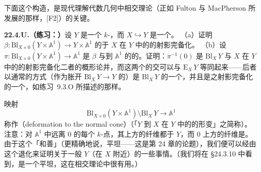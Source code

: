下面这个构造，是现代理解代数几何中相交理论（正如 Fulton 与 MacPherson 所发展的那样，[F2]）的关键。

\textbf{22.4.U.（练习：\trDeformationToTheNormalCone）}\quad 设 $Y$ 是一个 $k$-\trVariety，而 $X\hookrightarrow Y$ 是一个\trClosedSubscheme。
（a）证明 $\beta\colon\mathrm{Bl}_{X\times 0}(Y\times\mathbb{A}^1)\to Y\times\mathbb{A}^1$ 的\trExceptionalDivisor{}\trIsomorphic{}于 $X$ 在 $Y$ 中的\trNormal\trCone{}的射影完备化。
（b）设 $\pi\colon\mathrm{Bl}_{X\times 0}(Y\times\mathbb{A}^1)\to\mathbb{A}^1$ 是 $\beta$ 与到 $\mathbb{A}^1$ 的\trProjection{}的\trComposition。证明：$\pi^{-1}(0)$ 是 $\mathrm{Bl}_X\,Y$ 与 $X$ 在 $Y$ 中的\trNormal\trCone{}的射影完备化二者的概形论并，而这两个\trSubscheme{}的交可以与 $\mathrm{E}_X\,Y$ 等同起来——后者以通常的方式（作为胀开 $\mathrm{Bl}_X\,Y\to Y$ 的\trExceptionalDivisor）是 $\mathrm{Bl}_X\,Y$ 的一个\trClosedSubscheme，并且是\trNormal\trCone{}之射影完备化的一个\trClosedSubscheme，如\mbox{练习~9.3.O} 所描述的那样。

映射
\[
\mathrm{Bl}_{X\times 0}(Y\times\mathbb{A}^1)\setminus\mathrm{Bl}_X\,Y\longrightarrow\mathbb{A}^1
\]
称作\textbf{\trDeformationToTheNormalCone}（deformation to the normal cone）（「$Y$ 到 $X$ 在 $Y$ 中的\trNormal\trCone{}的形变」之简称）。注意：对 $\mathbb{A}^1$ 中远离 $0$ 的每个 $k$-点，其上方的纤维都\trCanonically{}\trIsomorphic{}于 $Y$，而 $0$ 上方的纤维是\trNormal\trCone。由于这个\trFamily{}「和善」（更精确地说，平坦——这是第 24 章的论题），我们便可以经由这个退化来证明关于一般 $Y$（在 $X$ 附近）的一些事情。（我们将在 \S24.3.10 中看到，\trDeformationToTheNormalCone{}是一个平坦\trMorphism，这在相交理论中很有用。）
